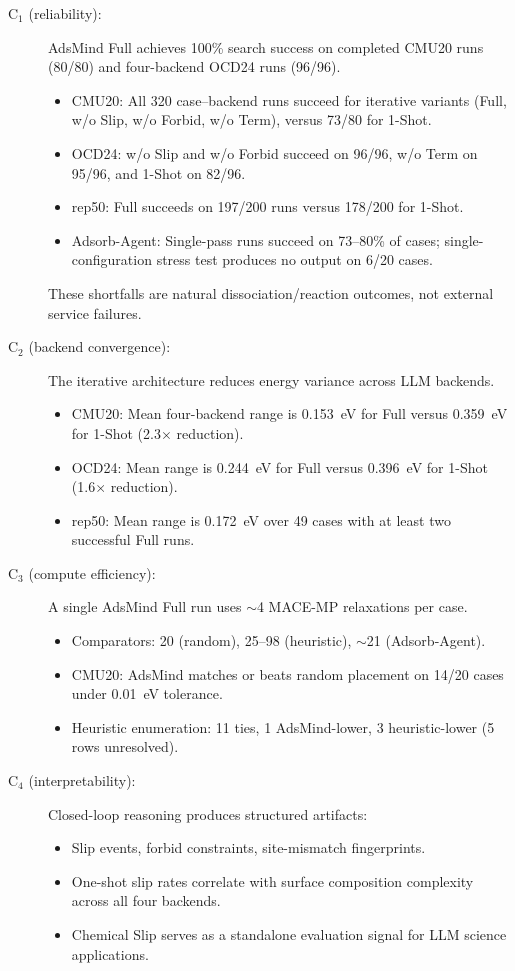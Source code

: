 \begin{description}
    \item[C$_1$ (reliability):] AdsMind Full achieves 100\% search success on completed CMU20 runs (80/80) and four-backend OCD24 runs (96/96).
    \begin{itemize}
        \item CMU20: All 320 case--backend runs succeed for iterative variants (Full, w/o Slip, w/o Forbid, w/o Term), versus 73/80 for 1-Shot.
        \item OCD24: w/o Slip and w/o Forbid succeed on 96/96, w/o Term on 95/96, and 1-Shot on 82/96.
        \item rep50: Full succeeds on 197/200 runs versus 178/200 for 1-Shot.
        \item Adsorb-Agent: Single-pass runs succeed on 73--80\% of cases; single-configuration stress test produces no output on 6/20 cases.
    \end{itemize}
    These shortfalls are natural dissociation/reaction outcomes, not external service failures.

    \item[C$_2$ (backend convergence):] The iterative architecture reduces energy variance across LLM backends.
    \begin{itemize}
        \item CMU20: Mean four-backend range is 0.153~eV for Full versus 0.359~eV for 1-Shot (2.3$\times$ reduction).
        \item OCD24: Mean range is 0.244~eV for Full versus 0.396~eV for 1-Shot (1.6$\times$ reduction).
        \item rep50: Mean range is 0.172~eV over 49 cases with at least two successful Full runs.
    \end{itemize}

    \item[C$_3$ (compute efficiency):] A single AdsMind Full run uses $\sim$4 MACE-MP relaxations per case.
    \begin{itemize}
        \item Comparators: 20 (random), 25--98 (heuristic), $\sim$21 (Adsorb-Agent).
        \item CMU20: AdsMind matches or beats random placement on 14/20 cases under 0.01~eV tolerance.
        \item Heuristic enumeration: 11 ties, 1 AdsMind-lower, 3 heuristic-lower (5 rows unresolved).
    \end{itemize}

    \item[C$_4$ (interpretability):] Closed-loop reasoning produces structured artifacts:
    \begin{itemize}
        \item Slip events, forbid constraints, site-mismatch fingerprints.
        \item One-shot slip rates correlate with surface composition complexity across all four backends.
        \item Chemical Slip serves as a standalone evaluation signal for LLM science applications.
    \end{itemize}
\end{description}


